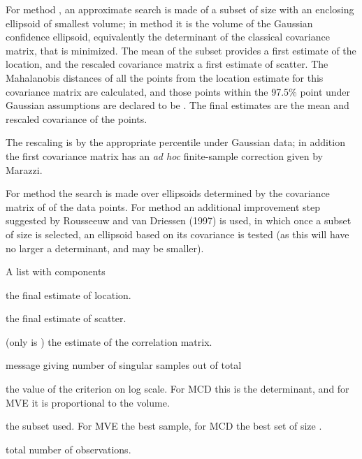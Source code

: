 \begin{Details}\relax
For method , an approximate search is made of a subset of
size  with an enclosing ellipsoid of smallest volume; in
method  it is the volume of the Gaussian confidence
ellipsoid, equivalently the determinant of the classical covariance
matrix, that is minimized. The mean of the subset provides a first
estimate of the location, and the rescaled covariance matrix a first
estimate of scatter. The Mahalanobis distances of all the points from
the location estimate for this covariance matrix are calculated, and
those points within the 97.5\% point under Gaussian assumptions are
declared to be . The final estimates are the mean and rescaled
covariance of the  points.

The rescaling is by the appropriate percentile under Gaussian data; in
addition the first covariance matrix has an \emph{ad hoc} finite-sample
correction given by Marazzi.

For method  the search is made over ellipsoids determined
by the covariance matrix of  of the data points. For method
 an additional improvement step suggested by Rousseeuw and
van Driessen (1997) is used, in which once a subset of size
 is selected, an ellipsoid based on its covariance
is tested (as this will have no larger a determinant, and may be smaller).\end{Details}
\begin{Value}
A list with components

\begin{ldescription}
\item[\code{center}] the final estimate of location.

\item[\code{cov}] the final estimate of scatter.

\item[\code{cor}] (only is ) the estimate of the correlation
matrix.

\item[\code{sing}] message giving number of singular samples out of total

\item[\code{crit}] the value of the criterion on log scale. For MCD this is
the determinant, and for MVE it is proportional to the volume.

\item[\code{best}] the subset used. For MVE the best sample, for MCD the best
set of size .

\item[\code{n.obs}] total number of observations.

\end{ldescription}
\end{Value}

